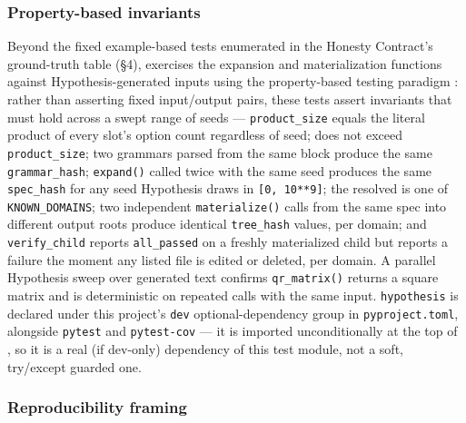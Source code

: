 \documentclass[
]{article}
\begin{document}
\subsubsection{Property-based
invariants}\label{property-based-invariants}

Beyond the fixed example-based tests enumerated in the Honesty
Contract's ground-truth table (§4),
 exercises the expansion and
materialization functions against Hypothesis-generated inputs using the
property-based testing paradigm
\citep{claessen2000quickcheck, maciver2019hypothesis}: rather than
asserting fixed input/output pairs, these tests assert invariants that
must hold across a swept range of seeds --- \texttt{product\_size}
equals the literal product of every slot's option count regardless of
seed;  does not exceed
\texttt{product\_size}; two grammars parsed from the same block produce
the same \texttt{grammar\_hash}; \texttt{expand()} called twice with the
same seed produces the same \texttt{spec\_hash} for any seed Hypothesis
draws in \texttt{{[}0,\ 10**9{]}}; the resolved
 is one of \texttt{KNOWN\_DOMAINS}; two
independent \texttt{materialize()} calls from the same spec into
different output roots produce identical \texttt{tree\_hash} values, per
domain; and \texttt{verify\_child} reports \texttt{all\_passed} on a
freshly materialized child but reports a failure the moment any listed
file is edited or deleted, per domain. A parallel Hypothesis sweep over
generated text confirms \texttt{qr\_matrix()} returns a square matrix
and is deterministic on repeated calls with the same input.
\texttt{hypothesis} is declared under this project's \texttt{dev}
optional-dependency group in \texttt{pyproject.toml}, alongside
\texttt{pytest} and \texttt{pytest-cov} --- it is imported
unconditionally at the top of , so
it is a real (if dev-only) dependency of this test module, not a soft,
try/except guarded one.

\subsubsection{Reproducibility framing}\label{reproducibility-framing}
\end{document}
